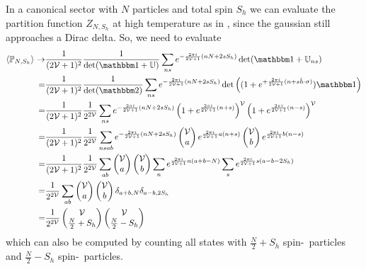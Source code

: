 In a canonical sector with $N$ particles and total spin $S_h$ we can evaluate the partition function $Z_{N,S_h}$ at high temperature as in , since the gaussian still approaches a Dirac delta.
So, we need to evaluate
\begin{align}
    \expectation{\PP_{N,S_h}}
    \goesto&
    \oneover{(2\Volume+1)^2}\oneover{\det(\one+\UU)} \sum_{ns} e^{-\frac{2\pi i}{2\Volume+1}(nN+2sS_h)} \det(\one+\UU_{ns})
    \nonumber\\
    =&
    \oneover{(2\Volume+1)^2}\oneover{\det(\two)} \sum_{ns} e^{-\frac{2\pi i}{2\Volume+1}(nN+2sS_h)} \det\left((1+e^{+\frac{2\pi i}{2\Volume+1}(n + s \hat{h}\cdot\sigma)})\one\right)
    \nonumber\\
    =&
    \oneover{(2\Volume+1)^2}\oneover{2^{2\Volume}} \sum_{ns} e^{-\frac{2\pi i}{2\Volume+1}(nN+2sS_h)} \left(1+e^{\frac{2\pi i}{2\Volume+1}(n+s)}\right)^\Volume \left(1+e^{\frac{2\pi i}{2\Volume+1}(n-s)}\right)^\Volume 
    \nonumber\\
    =&
    \oneover{(2\Volume+1)^2}\oneover{2^{2\Volume}} \sum_{nsab} e^{-\frac{2\pi i}{2\Volume+1}(nN+2sS_h)} \begin{pmatrix} \Volume \\ a \end{pmatrix} e^{\frac{2\pi i}{2\Volume+1} a (n+s)} \begin{pmatrix} \Volume \\ b \end{pmatrix} e^{\frac{2\pi i}{2\Volume+1} b (n-s)}
    \nonumber\\
    =&
    \oneover{(2\Volume+1)^2}\oneover{2^{2\Volume}} \sum_{ab} \begin{pmatrix} \Volume \\ a \end{pmatrix} \begin{pmatrix} \Volume \\ b \end{pmatrix} \sum_n e^{\frac{2\pi i}{2\Volume+1}n(a+b-N)} \sum_s e^{\frac{2\pi i}{2\Volume+1}s(a-b-2S_h)}
    \nonumber\\
    =&
    \oneover{2^{2\Volume}} \sum_{ab} \begin{pmatrix} \Volume \\ a \end{pmatrix} \begin{pmatrix} \Volume \\ b \end{pmatrix} \delta_{a+b,N} \delta_{a-b,2S_h}
    \nonumber\\
    =&
    \oneover{2^{2\Volume}} \begin{pmatrix} \Volume \\ \frac{N}{2} + S_h \end{pmatrix} \begin{pmatrix} \Volume \\ \frac{N}{2}-S_h \end{pmatrix}
    \label{eq:canonical infinite-temperature partition function}
\end{align}
which can also be computed by counting all states with $\frac{N}{2} + S_h$ spin-\up\ particles and $\frac{N}{2} - S_h$ spin-\dn\ particles.

